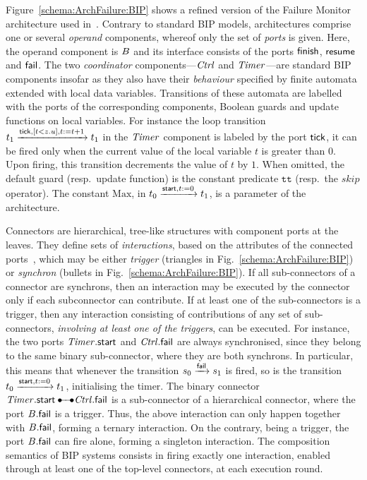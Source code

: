 \documentclass{llncs}
\newcommand{\Ludo}{\\\hfill\mdash Ludo}
\newcommand{\noteLH}[2][color=orange!40, size=\tiny]{\todo[#1]{{#2}\Ludo}}
\newcommand{\mdash}[1][]{---#1}
\newcommand{\resp}[1][\ ]{resp.#1}
\newcommand{\goesto}[2][]{\ensuremath{\xrightarrow[#1]{#2}}}
\newcommand{\true} {\ensuremath{\mathtt{t\!t}}}
\begin{document}
Figure~\ref{schema:ArchFailure:BIP} shows a refined version of the
Failure Monitor architecture used in~\cite{CubETH-case-study}.
Contrary to standard BIP models, architectures comprise one or several
\emph{operand} components, whereof only the set of \emph{ports} is
given.  Here, the operand component is $B$ and its interface
consists of the ports $\mathsf{finish}$, $\mathsf{resume}$ and $\mathsf{fail}$.
The two \emph{coordinator} components\mdash $\mathit{Ctrl}$ and
$\mathit{Timer}$\mdash are standard BIP components insofar as they also
have their \emph{behaviour} specified by finite automata extended with
local data variables.  Transitions of these automata are labelled with
the ports of the corresponding components, Boolean guards and update
functions on local variables.  For instance the loop transition
$\tstate{1} \goesto{\PortTick, \GuardTick[], \TimerUpd[]} \tstate{1}$
in the $\mathit{Timer}$ component is labeled by the port $\mathsf{tick}$, it
can be fired only when the current value of the local variable $t$ is
greater than $0$.  Upon firing, this transition decrements the value
of $t$ by $1$.  When omitted, the default guard (\resp update
function) is the constant predicate $\true$ (\resp the $\mathit{skip}$
operator).  The constant $\mathrm{Max}$, in $\tstate{0}
\goesto{\PortStart, \TimerInit[]} \tstate{1}$, is a parameter of the
architecture.\noteLH{It looks like Max is in zone, I do not understand}

Connectors are hierarchical, tree-like structures with component ports
at the leaves.  They define sets of \emph{interactions}, based on the
attributes of the connected ports~\cite{BliSif08-acp-tc}, which may be
either \emph{trigger} (triangles in Fig.~\ref{schema:ArchFailure:BIP})
or \emph{synchron} (bullets in Fig.~\ref{schema:ArchFailure:BIP}).
%
If all sub-connectors of a connector are synchrons, then an
interaction may be executed by the connector only if each subconnector
can contribute.
%
If at least one of the sub-connectors is a trigger, then any
interaction consisting of contributions of any set of sub-connectors,
\emph{involving at least one of the triggers}, can be executed.
%
For instance, the two ports $\mathit{Timer}.\mathsf{start}$ and
$\mathit{Ctrl}.\mathsf{fail}$ are always synchronised, since they belong to
the same binary sub-connector, where they are both synchrons.  In
particular, this means that whenever the transition $\cstate{0}
\goesto{\PortFail} \cstate{1}$ is fired, so is the transition
$\tstate{0} \goesto{\PortStart, \TimerInit[]} \tstate{1}$,
initialising the timer.  The binary connector $\NameTimer.\PortStart
\bullet\!\!\!-\!\!\!-\!\!\!\bullet \NameCtrl.\PortFail$ is a
sub-connector of a hierarchical connector, where the port
$B.\mathsf{fail}$ is a trigger.  Thus, the above interaction can
only happen together with $B.\mathsf{fail}$, forming a
ternary interaction.  On the contrary, being a trigger, the port
$B.\mathsf{fail}$ can fire alone, forming a singleton
interaction.  The composition semantics of BIP systems consists in
firing exactly one interaction, enabled through at least one of the
top-level connectors, at each execution round.
\end{document}
